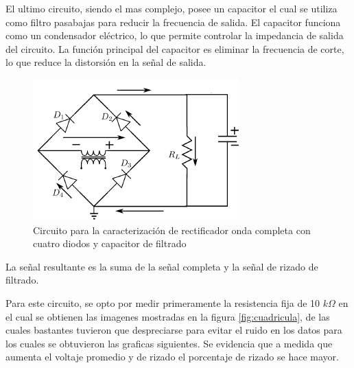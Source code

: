 \documentclass[10pt,letterpaper]{article}
\begin{document}
El ultimo circuito, siendo el mas complejo, posee un capacitor el cual 
se utiliza como filtro pasabajas para reducir la frecuencia de salida. El capacitor
funciona como un condensador eléctrico, lo que permite controlar la impedancia de salida
del circuito. La función principal del capacitor es eliminar la frecuencia de corte,
lo que reduce la distorsión en la señal de salida.

\begin{figure}[H]
	\centering
	\includegraphics[scale=1]{OndaCapacitorFiltrado.png}
	\caption{Circuito para la caracterización de rectificador onda completa con cuatro diodos y capacitor de filtrado}
	\label{fig:filtrado}
\end{figure}

La señal resultante es la suma de la señal completa y la señal de rizado de filtrado.

Para este circuito, se opto por medir primeramente la resistencia fija de 10 $k\Omega$ en el cual se obtienen las imagenes mostradas en la figura \ref{fig:cuadricula}, de las cuales bastantes tuvieron que despreciarse para evitar el ruido en los datos para los cuales se obtuvieron las graficas siguientes. Se evidencia que a medida que aumenta el voltaje promedio y de rizado el porcentaje de rizado se hace mayor.
\end{document}
